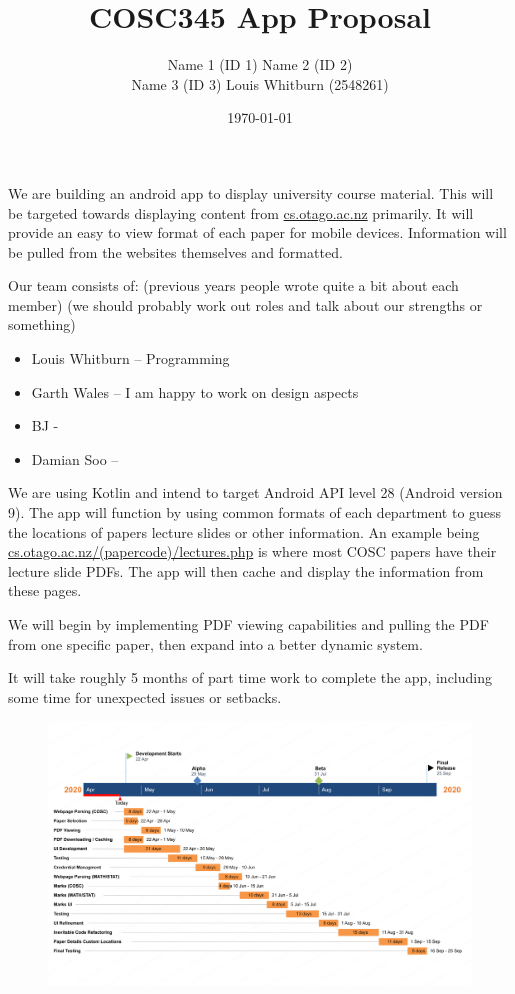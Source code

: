 \documentclass{article}
\title{COSC345 App Proposal}
\author{Name 1 (ID 1) Name 2 (ID 2) \\ Name 3 (ID 3) Louis Whitburn (2548261)}
\date{\today}
\begin{document}
	\maketitle
	
	We are building an android app to display university course material. This will be targeted towards displaying content from \url{cs.otago.ac.nz} primarily. It will provide an easy to view format of each paper for mobile devices. Information will be pulled from the websites themselves and formatted.
	
	Our team consists of: (previous years people wrote quite a bit about each member)
	(we should probably work out roles and talk about our strengths or something)
	\begin{itemize}
		\item Louis Whitburn – Programming
		\item Garth Wales – I am happy to work on design aspects
		\item BJ - 
		\item Damian Soo – 
	\end{itemize}

	We are using Kotlin and intend to target Android API level 28 (Android version 9). The app will function by using common formats of each department to guess the locations of papers lecture slides or other information. An example being \url{cs.otago.ac.nz/(papercode)/lectures.php} is where most COSC papers have their lecture slide PDFs. The app will then cache and display the information from these pages.

	We will begin by implementing PDF viewing capabilities and pulling the PDF from one specific paper, then expand into a better dynamic system. 

	It will take roughly 5 months of part time work to complete the app, including some time for unexpected issues or setbacks.
	
	\begin{figure}[h!]
		\centering
		\includegraphics[width=\linewidth]{chart.png}
	\end{figure}
	
\end{document}
